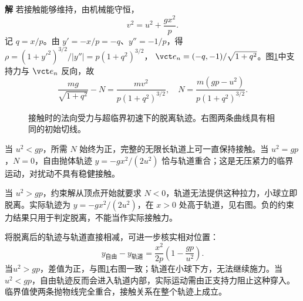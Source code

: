 \documentclass[11pt,openany,fontset=fandol]{ctexbook}
\theoremstyle{definition}\newtheorem{example}{例}[chapter]\newtheorem{exercise}{习题}[chapter]
\newcommand{\SolutionStart}{\par\medskip\ifdim\pagetotal>0pt\ifdim\dimexpr\pagegoal-\pagetotal\relax<3\baselineskip\newpage\fi\fi\noindent\textbf{解}\quad\ignorespaces}
\newenvironment{solution}{\SolutionStart}{\par\medskip}
\begin{document}
\begin{solution}
若接触能够维持，由机械能守恒，
\[
v^2=u^2+\frac{gx^2}{p}.
\]
记 $q=x/p$。由 $y'=-x/p=-q$、$y''=-1/p$，得 $\rho=(1+y'^2)^{3/2}/|y''|=p(1+q^2)^{3/2}$，
$\vct e_n=(-q,-1)/\sqrt{1+q^2}$。图\ref{mp3:fig:l3-p3-s}中支持力与 $\vct e_n$ 反向，故
\[
\frac{mg}{\sqrt{1+q^2}}-N=\frac{mv^2}{p(1+q^2)^{3/2}},
\quad
N=\frac{m(gp-u^2)}{p(1+q^2)^{3/2}}.
\]

\begin{figure}[H]\centering
{}
\caption{接触时的法向受力与超临界初速下的脱离轨迹。右图两条曲线具有相同的初始切线。}\label{mp3:fig:l3-p3-s}
\end{figure}


当 $u^2<gp$，所需 $N$ 始终为正，完整的无限长轨道上可一直保持接触。当 $u^2=gp$，$N=0$，自由抛体轨迹
$y=-gx^2/(2u^2)$ 恰与轨道重合；这是无压紧力的临界运动，对扰动不具有稳健接触。

当 $u^2>gp$，约束解从顶点开始就要求 $N<0$，轨道无法提供这种拉力，小球立即脱离。实际轨迹为 $y=-gx^2/(2u^2)$，在 $x>0$ 处高于轨道，见右图。负的约束力结果只用于判定脱离，不能当作实际接触力。

将脱离后的轨迹与轨道直接相减，可进一步核实相对位置：
\[
 y_{\text{自由}}-y_{\text{轨道}}
 =\frac{x^2}{2p}\left(1-\frac{gp}{u^2}\right).
\]
当$u^2>gp$，差值为正，与图\ref{mp3:fig:l3-p3-s}右图一致；轨道在小球下方，无法继续施力。当$u^2<gp$，自由轨迹反而会进入轨道内部，实际运动需由正支持力阻止这种穿入。临界值使两条抛物线完全重合，接触关系在整个轨迹上成立。
\end{solution}
\end{document}
